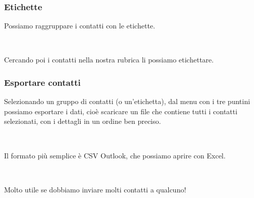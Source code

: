 \documentclass[handout]{beamer}
\begin{document}
\begin{frame}
\frametitle{Etichette}
Possiamo raggruppare i contatti con le etichette.\pause

~

Cercando poi i contatti nella nostra rubrica li possiamo etichettare.

\end{frame}



\begin{frame}
\frametitle{Esportare contatti}
Selezionando un gruppo di contatti (o un'etichetta), dal menu con i tre puntini possiamo esportare i dati, cioè \alert{scaricare un file} che contiene tutti i contatti selezionati, con i dettagli in un ordine ben preciso.\pause

~

Il formato più semplice è \alert{CSV Outlook}, che possiamo aprire con Excel.
\pause

~

Molto utile se dobbiamo inviare molti contatti a qualcuno!
\end{frame}
\end{document}
